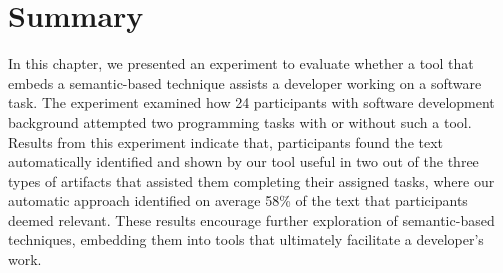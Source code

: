\section{Summary}
\label{cp6:summary}



In this chapter, we presented an experiment to evaluate whether a tool that embeds a semantic-based technique assists a developer working on a software task. 
The experiment examined how 24 participants with software development background attempted 
two programming tasks with or without such a tool. 
Results from this experiment indicate that, 
participants found the text automatically identified and shown by our tool useful in two 
out of the three types of artifacts that assisted them completing their assigned tasks,
where our automatic approach identified on average 58\% of the text that participants deemed relevant. 
These results encourage further exploration of semantic-based techniques, 
embedding them into tools that ultimately facilitate a developer's work.